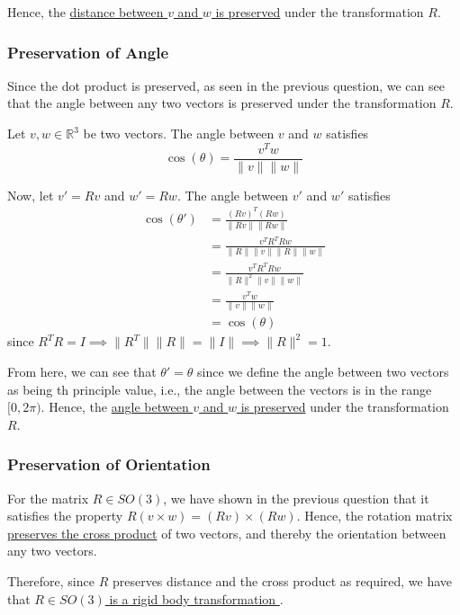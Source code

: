 Hence, the \underline{distance between \(v\) and \(w\) is preserved} under the transformation \(R\).

\subsubsection*{Preservation of Angle}

Since the dot product is preserved, as seen in the previous question, we can see that the angle between any two vectors is preserved under the transformation \( R \).

Let \(v, w \in \mathbb{R}^{3}\) be two vectors. The angle between \(v\) and \(w\) satisfies
\[
    \cos(\theta) = \frac{v^{T} w}{\lVert v \rVert \lVert w \rVert}
\]

Now, let \(v' = R v\) and \(w' = R w\). The angle between \(v'\) and \(w'\) satisfies
\begin{align*}
    \cos(\theta')
     & = \frac{{(R v)}^{T} (R w)}{\lVert R v \rVert \lVert R w \rVert}
    \\ & = \frac{v^{T} R^{T} R w}{\lVert R \rVert \lVert v \rVert \lVert R \rVert \lVert w \rVert}
    \\ & = \frac{v^{T} R^{T} R w}{\lVert R \rVert ^ 2 \lVert v \rVert \lVert w \rVert}
    \\ & = \frac{v^{T} w}{\lVert v \rVert \lVert w \rVert}
    \\ & = \cos(\theta)
\end{align*}
since \(R^{T} R = I \implies \lVert R^T \rVert \lVert R \rVert = \lVert I \rVert \implies \lVert R \rVert ^2 = 1\).

From here, we can see that \( \theta' = \theta \) since we define the angle between two vectors as being th principle value, i.e., the angle between the vectors is in the range \([0, 2\pi)\).
Hence, the \underline{angle between \(v\) and \(w\) is preserved} under the transformation \(R\).

\subsubsection*{Preservation of Orientation}

For the matrix \( R \in S O(3) \), we have shown in the previous question that it satisfies the property \( R(v \times w) = (R v) \times (R w) \).
Hence, the rotation matrix \underline{preserves the cross product} of two vectors, and thereby the orientation between any two vectors.

Therefore, since \( R \) preserves distance and the cross product as required, we have that \underline{ \(R \in S O(3)\) is a rigid body transformation }.
